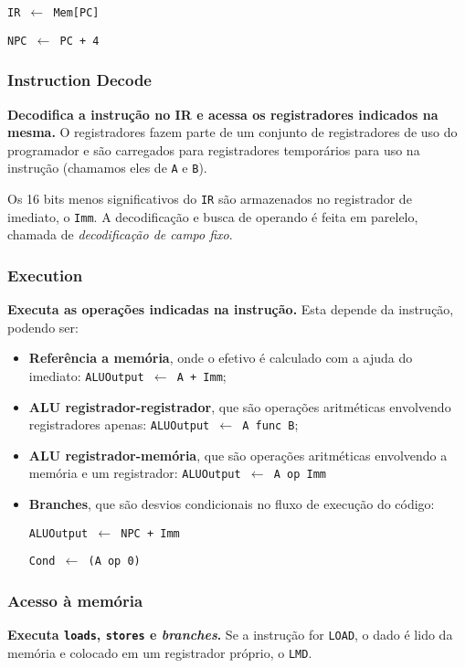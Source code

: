 \texttt{IR $\leftarrow$ Mem[PC]}

\texttt{NPC $\leftarrow$ PC + 4}




\subsubsection*{Instruction Decode}
\textbf{Decodifica a instrução no IR e acessa os registradores indicados na mesma.} O registradores fazem parte de um conjunto de registradores de uso do programador e são carregados para registradores temporários para uso na instrução (chamamos eles de \texttt{A} e \texttt{B}).

Os 16 bits menos significativos do \texttt{IR} são armazenados no registrador de imediato, o \texttt{Imm}. A decodificação e busca de operando é feita em parelelo, chamada de \textit{decodificação de campo fixo}.



\subsubsection*{Execution}
\textbf{Executa as operações indicadas na instrução.} Esta depende da instrução, podendo ser:
\begin{itemize}
  \item \textbf{Referência a memória}, onde o efetivo é calculado com a ajuda do imediato: \texttt{ALUOutput $\leftarrow$ A + Imm};

  \item \textbf{ALU registrador-registrador}, que são operações aritméticas envolvendo registradores apenas: \texttt{ALUOutput $\leftarrow$ A func B};

  \item \textbf{ALU registrador-memória}, que são operações  aritméticas envolvendo a memória e um registrador: \texttt{ALUOutput $\leftarrow$ A op Imm}

  \item \textbf{Branches}, que são desvios condicionais no fluxo de execução do código:

  \texttt{ALUOutput $\leftarrow$ NPC + Imm}

  \texttt{Cond $\leftarrow$ (A op 0)}
\end{itemize}



\subsubsection*{Acesso à memória}
\textbf{Executa \texttt{loads}, \texttt{stores} e \textit{branches}.} Se a instrução for \texttt{LOAD}, o dado é lido da memória e colocado em um registrador próprio, o \texttt{LMD}.

